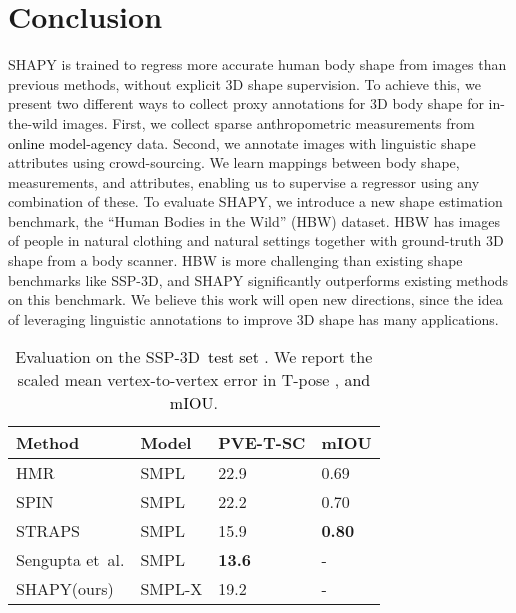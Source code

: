 \documentclass[10pt,twocolumn,letterpaper]{article}
\newcommand{\modelCOLOR}{black}
\newcommand{\modelname}{{\color{\modelCOLOR}SHAPY}\xspace}
\newcommand{\straps}{\mbox{STRAPS}\xspace}
\newcommand{\tpose}{\mbox{T-pose}\xspace}
\newcommand{\threeD}{3D\xspace}
\newcommand{\ssp}{\mbox{SSP-\threeD}\xspace}
\newcommand{\vspaceTABaboveCaption}{-0.0 em}
\newcommand{\hbw}{\mbox{HBW}\xspace}
\newcommand{\hmr}{\mbox{HMR}\xspace}
\newcommand{\spin}{\mbox{SPIN}\xspace}
\newcommand{\smplx}{\mbox{SMPL-X}\xspace}
\newcommand{\smpl}{\mbox{SMPL}\xspace}
\renewcommand{\etal}{\mbox{et al.}\xspace}
\newcommand{\cameraready}[1]{\textcolor{Fuchsia}{{#1}}\xspace}
\renewcommand{\cameraready}[1]{\textcolor{black}{{#1}}\xspace}
\newcommand{\myarraystretch}[0]{1.1}
\newcommand{\colorTERM}{blue}
\renewcommand{\colorTERM}{black}
\newcommand{\measurements}[0]{{\color{\colorTERM}anthropometric measurements}\xspace}
\newcommand{\linguisticshapeattributes}[0]{{\color{\colorTERM}linguistic shape attributes}\xspace}
\begin{document}
\section{Conclusion}
\modelname is trained to regress more accurate human body shape from images than previous methods, without explicit \threeD shape supervision.
To achieve this,  we present two different ways to collect
proxy annotations for \threeD body shape for in-the-wild images. 
First, we collect sparse \measurements from 
\cameraready{online model-agency} data.
Second, we annotate images with \linguisticshapeattributes using crowd-sourcing.
We learn mappings between body shape, measurements, and attributes, enabling us to supervise a regressor using any combination of these.
To evaluate \modelname, we introduce a new shape estimation benchmark, the ``Human Bodies in the Wild'' (\hbw) dataset. \hbw has images of people in natural clothing and natural settings together with ground-truth \threeD shape from a body scanner.
\hbw is more challenging than existing shape benchmarks like \ssp, and \modelname significantly outperforms existing methods on this benchmark. 
We believe this work will open new  directions, since the idea of leveraging linguistic annotations to improve \threeD shape has many applications. 

\begin{table}[t]
\renewcommand{\arraystretch}{\myarraystretch} 
\centering
\scriptsize
\begin{tabular}{llll}
    \toprule
    Method &
    Model & PVE-T-SC & mIOU\\
    \midrule
    \hmr    \cite{Kanazawa2018_hmr}        & \smpl & 22.9    & 0.69    \\
    \spin   \cite{Kolotouros2019_spin}     & \smpl & 22.2    & 0.70    \\
    \straps \cite{sengupta2020straps}      & \smpl & 15.9    & \textbf{0.80}    \\
    Sengupta \etal \cite{sengupta2021hierarchicalICCV}  & \smpl &  \textbf{13.6} &   -     \\
    \modelname (ours)          & \smplx        & 19.2       & -       \\ 
    \bottomrule
\end{tabular}
\vspace{\vspaceTABaboveCaption}
\caption{
        Evaluation on the \ssp~\cameraready{test set} \cite{sengupta2020straps}. 
        We report the scaled mean vertex-to-vertex error in \tpose
        \cite{sengupta2020straps}, \cameraready{and mIOU}.
}
\label{tab:straps}
\end{table}
\end{document}
